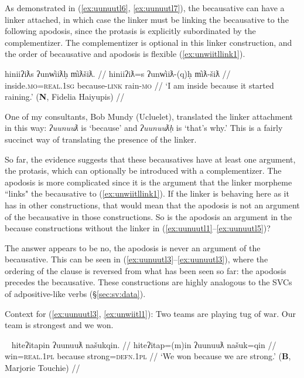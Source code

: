 
As demonstrated in (\ref{ex:uunuutl6}, \ref{ex:uunuutl7}), the becausative can have a linker attached, in which case the linker must be linking the becausative to the following apodosis, since the protasis is explicitly subordinated by the complementizer. The complementizer is optional in this linker construction, and the order of becausative and apodosis is flexible (\ref{ex:unwiitllink1}).

\ex \label{ex:unwiitllink1}
\begingl
\glpreamble hiniiʔiƛs ʔunw̓iiƛḥ m̓iƛšiƛ. //
\gla hiniiʔiƛ=s ʔunw̓iiƛ-(q)ḥ m̓iƛ-šiƛ //
\glb inside.\textsc{mo}=\textsc{real.1sg} because-\textsc{link} rain-\textsc{mo} //
\glft `I am inside because it started raining.' (\textbf{N}, Fidelia Haiyupis) //
\endgl
\xe

One of my consultants, Bob Mundy (Ucluelet), translated the linker attachment in this way: \textit{ʔuunuuƛ} is `because' and \textit{ʔuunuuƛḥ} is `that's why.' This is a fairly succinct way of translating the presence of the linker.

So far, the evidence suggests that these becausatives have at least one argument, the protasis, which can optionally be introduced with a complementizer. The apodosis is more complicated since it is the argument that the linker morpheme ``links" the becausative to (\ref{ex:unwiitllink1}). If the linker is behaving here as it has in other constructions, that would mean that the apodosis is not an argument of the becausative in those constructions. So is the apodosis an argument in the because constructions without the linker in (\ref{ex:uunuutl1}--\ref{ex:uunuutl5})?

The answer appears to be no, the apodosis is never an argument of the becausative. This can be seen in (\ref{ex:uunuutl3}--\ref{ex:uunuutl3}), where the ordering of the clause is reversed from what has been seen so far: the apodosis precedes the becausative. These constructions are highly analogous to the SVCs of adpositive-like verbs (\S\ref{sec:sv:data}).

\vspace{5pt}

\noindent Context for (\ref{ex:uunuutl3}, \ref{ex:unwiitl1}): Two teams are playing tug of war. Our team is strongest and we won.

\ex~ \label{ex:uunuutl3}
\begingl
\glpreamble hiteʔitapin ʔuunuuƛ našukqin. //
\gla hiteʔitap=(m)in ʔuunuuƛ našuk=qin //
\glb win=\textsc{real.1pl} because strong=\textsc{defn.1pl} //
\glft `We won because we are strong.' (\textbf{B}, Marjorie Touchie) //
\endgl
\xe

